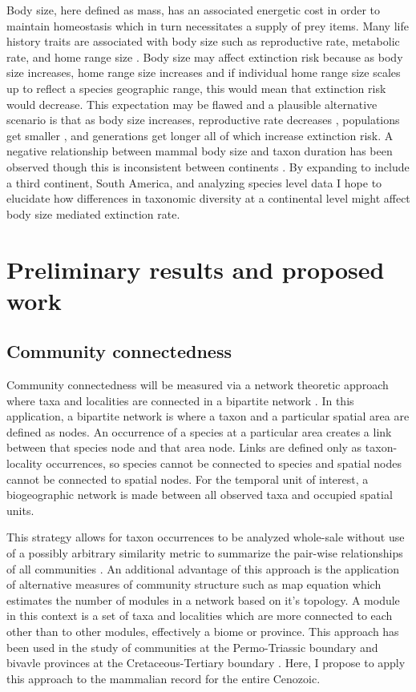 \documentclass[11pt,letterpaper]{article}
\begin{document}
Body size, here defined as mass, has an associated energetic cost in order to maintain homeostasis which in turn necessitates a supply of prey items. Many life history traits are associated with body size such as reproductive rate, metabolic rate, and home range size \cite{Peters1983a,Damuth1979,Brown1987,Smith2004}. Body size may affect extinction risk because as body size increases, home range size increases \citep{Damuth1979} and if individual home range size scales up to reflect a species geographic range, this would mean that extinction risk would decrease. This expectation may be flawed and a plausible alternative scenario is that as body size increases, reproductive rate decreases \citep{Johnson2002b}, populations get smaller \citep{White2007}, and generations get longer \citep{Martin1993a} all of which increase extinction risk. A negative relationship between mammal body size and taxon duration has been observed \citep{Liow2008,Davidson2012} though this is inconsistent between continents \citep{Tomiya2013,Liow2008}. By expanding to include a third continent, South America, and analyzing species level data I hope to elucidate how differences in taxonomic diversity at a continental level might affect body size mediated extinction rate. 

\section{Preliminary results and proposed work}
\subsection{Community connectedness}
Community connectedness will be measured via a network theoretic approach where taxa and localities are connected in a bipartite network \citep{Sidor2013,Vilhena2013,Vilhena2013b}. In this application, a bipartite network is where a taxon and a particular spatial area are defined as nodes. An occurrence of a species at a particular area creates a link between that species node and that area node. Links are defined only as taxon-locality occurrences, so species cannot be connected to species and spatial nodes cannot be connected to spatial nodes. For the temporal unit of interest, a biogeographic network is made between all observed taxa and occupied spatial units. %

This strategy allows for taxon occurrences to be analyzed whole-sale without use of a possibly arbitrary similarity metric to summarize the pair-wise relationships of all communities \citep{Sidor2013}. An additional advantage of this approach is the application of alternative measures of community structure such as map equation \citep{Rosvall2008,Rosvall2009a} which estimates the number of modules in a network based on it's topology. A module in this context is a set of taxa and localities which are more connected to each other than to other modules, effectively a biome or province. This approach has been used in the study of communities at the Permo-Triassic boundary \citep{Sidor2013} and bivavle provinces at the Cretaceous-Tertiary boundary \citep{Vilhena2013}. Here, I propose to apply this approach to the mammalian record for the entire Cenozoic.
\end{document}
